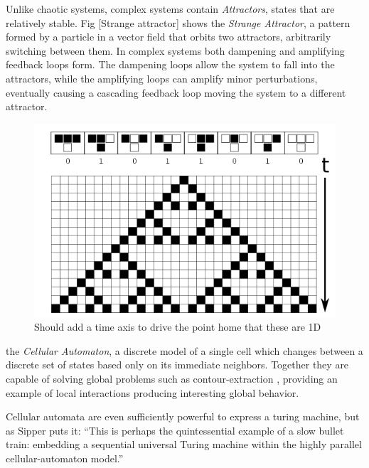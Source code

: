 Unlike chaotic systems, complex systems contain \emph{Attractors}, states that
are relatively stable.
Fig [Strange attractor] shows the \emph{Strange Attractor}, a pattern formed by
a particle in a vector field that orbits two attractors, arbitrarily switching
between them.
In complex systems both dampening and amplifying feedback loops form.
The dampening loops allow the system to fall into the attractors, while the
amplifying loops can amplify minor perturbations, eventually causing a cascading
feedback loop moving the system to a different attractor.\par
%
%
%
\begin{figure}[h!]
  \centering
  \includegraphics[width=1\textwidth]{fig/ca22.png}
  \caption{Should add a time axis to drive the point home that these are 1D}
  \label{figCA22}
\end{figure}
the \emph{Cellular Automaton}, a discrete model of a single cell which changes
between a discrete set of states based only on its immediate neighbors.
Together they are capable of solving global problems such
as contour-extraction \cite{sipper_emergence_1999}, providing an example of
local interactions producing interesting global behavior.\par
Cellular automata are even sufficiently powerful to express a turing machine,
but as Sipper puts it: ``This is perhaps the quintessential example of a slow
bullet train: embedding a sequential universal Turing machine within the
highly parallel cellular-automaton model.''
